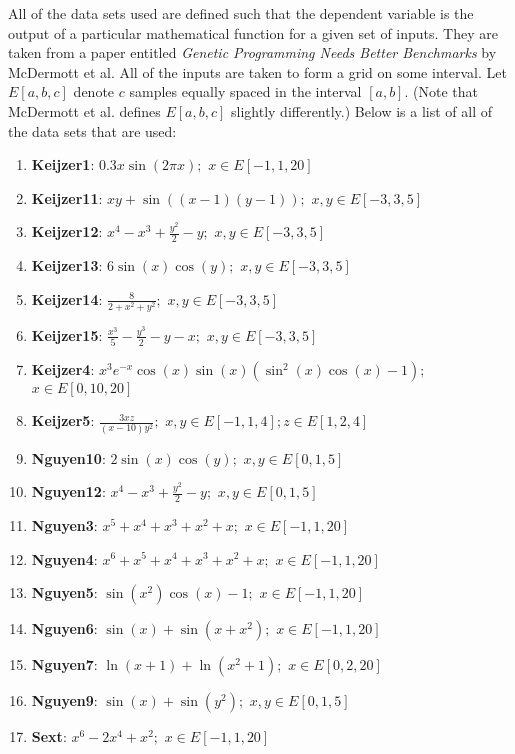 All of the data sets used are defined such that the dependent variable is the output of a particular mathematical function for a given set of inputs.  They are taken from a paper entitled \textit{Genetic Programming Needs Better Benchmarks} by McDermott et al. \cite{benchmarks}  All of the inputs are taken to form a grid on some interval.  Let $E[a, b, c]$ denote $c$ samples equally spaced in the interval $[a,b]$. (Note that McDermott et al. defines $E[a, b, c]$ slightly differently.)  Below is a list of all of the data sets that are used:

\begin{enumerate}[noitemsep]
\item \textbf{Keijzer1}: $0.3x \sin(2 \pi x);$ $x \in E[-1,1,20]$
\item \textbf{Keijzer11}: $x y+\sin((x-1)(y-1));$ $x, y \in E[-3,3,5]$
\item \textbf{Keijzer12}: $x^{4}-x^{3}+\frac{y^{2}}{2}-y;$ $x, y \in E[-3,3,5]$
\item \textbf{Keijzer13}: $6 \sin(x) \cos(y);$ $x, y \in E[-3,3,5]$
\item \textbf{Keijzer14}: $\frac{8}{2 + x^{2} + y^{2}};$ $x,y \in E[-3,3,5]$
\item \textbf{Keijzer15}: $\frac{x^{3}}{5} - \frac{y^{3}}{2} - y - x;$ $x, y \in E[-3,3,5]$
\item \textbf{Keijzer4}: $x^{3} e^{-x} \cos(x) \sin(x) (\sin^{2}(x) \cos(x) - 1);$ $x \in E[0,10,20]$
\item \textbf{Keijzer5}: $\frac{3 x z}{(x - 10) y^{2}};$ $x,y \in E[-1,1,4]; z \in E[1,2,4]$
\item \textbf{Nguyen10}: $2 \sin(x) \cos(y);$ $x,y \in E[0,1,5]$
\item \textbf{Nguyen12}: $x^{4} - x^{3} + \frac{y^{2}}{2} - y;$ $x,y \in E[0,1,5]$
\item \textbf{Nguyen3}: $x^{5} + x^{4} + x^{3} + x^{2} + x;$ $x \in E[-1,1,20]$
\item \textbf{Nguyen4}: $x^{6} + x^{5} + x^{4} + x^{3} + x^{2} + x;$ $x \in E[-1,1,20]$
\item \textbf{Nguyen5}: $\sin(x^{2}) \cos(x) - 1;$ $x \in E[-1,1,20]$
\item \textbf{Nguyen6}: $\sin(x) + \sin(x + x^{2});$ $x \in E[-1,1,20]$
\item \textbf{Nguyen7}: $\ln(x + 1) + \ln(x^{2} + 1);$ $x \in E[0,2,20]$
\item \textbf{Nguyen9}: $\sin(x) + \sin(y^{2});$ $x,y \in E[0,1,5]$
\item \textbf{Sext}: $x^{6} - 2 x^{4} + x^{2};$ $x \in E[-1,1,20]$
\end{enumerate}


